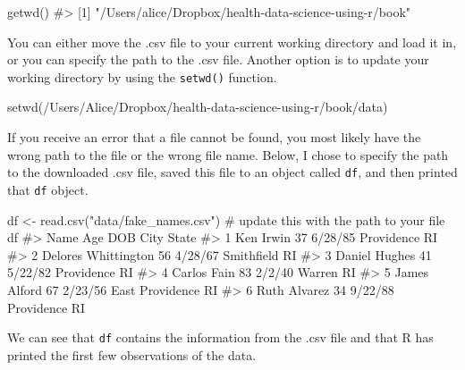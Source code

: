 \documentclass[
  letterpaper,
]{krantz}
\makeatletter
\newenvironment{Shaded}{\begin{snugshade}}{\end{snugshade}}
\newcommand{\CommentTok}[1]{\textcolor[rgb]{0.37,0.37,0.37}{#1}}
\newcommand{\FunctionTok}[1]{\textcolor[rgb]{0.28,0.35,0.67}{#1}}
\newcommand{\NormalTok}[1]{\textcolor[rgb]{0.00,0.23,0.31}{#1}}
\newcommand{\OtherTok}[1]{\textcolor[rgb]{0.00,0.23,0.31}{#1}}
\newcommand{\StringTok}[1]{\textcolor[rgb]{0.13,0.47,0.30}{#1}}
\newenvironment{kframe}{%
\medskip{}
\setlength{\fboxsep}{.8em}
 \def\at@end@of@kframe{}%
 \ifinner\ifhmode%
  \def\at@end@of@kframe{\end{minipage}}%
  \begin{minipage}{\columnwidth}%
 \fi\fi%
 \def\FrameCommand##1{\hskip\@totalleftmargin \hskip-\fboxsep
 \colorbox{shadecolor}{##1}\hskip-\fboxsep
     \hskip-\linewidth \hskip-\@totalleftmargin \hskip\columnwidth}%
 \MakeFramed {\advance\hsize-\width
   \@totalleftmargin\z@ \linewidth\hsize
   \@setminipage}}%
 {\par\unskip\endMakeFramed%
 \at@end@of@kframe}
\renewenvironment{Shaded}{\begin{kframe}}{\end{kframe}}
\makeatother
\begin{document}
\begin{Shaded}
\begin{Highlighting}[]
\FunctionTok{getwd}\NormalTok{()}
\CommentTok{\#\textgreater{} [1] "/Users/alice/Dropbox/health{-}data{-}science{-}using{-}r/book"}
\end{Highlighting}
\end{Shaded}

You can either move the .csv file to your current working directory and
load it in, or you can specify the path to the .csv file. Another option
is to update your working directory by using the \texttt{setwd()}
function.

\begin{Shaded}
\begin{Highlighting}[]
\FunctionTok{setwd}\NormalTok{(}\StringTok{\textquotesingle{}/Users/Alice/Dropbox/health{-}data{-}science{-}using{-}r/book/data\textquotesingle{}}\NormalTok{)}
\end{Highlighting}
\end{Shaded}

If you receive an error that a file cannot be found, you most likely
have the wrong path to the file or the wrong file name. Below, I chose
to specify the path to the downloaded .csv file, saved this file to an
object called \texttt{df}, and then printed that \texttt{df} object.

\begin{Shaded}
\begin{Highlighting}[]
\NormalTok{df }\OtherTok{\textless{}{-}} \FunctionTok{read.csv}\NormalTok{(}\StringTok{"data/fake\_names.csv"}\NormalTok{) }\CommentTok{\# update this with the path to your file}
\NormalTok{df}
\CommentTok{\#\textgreater{}                  Name Age     DOB            City State}
\CommentTok{\#\textgreater{} 1           Ken Irwin  37 6/28/85      Providence    RI}
\CommentTok{\#\textgreater{} 2 Delores Whittington  56 4/28/67      Smithfield    RI}
\CommentTok{\#\textgreater{} 3       Daniel Hughes  41 5/22/82      Providence    RI}
\CommentTok{\#\textgreater{} 4         Carlos Fain  83  2/2/40          Warren    RI}
\CommentTok{\#\textgreater{} 5        James Alford  67 2/23/56 East Providence    RI}
\CommentTok{\#\textgreater{} 6        Ruth Alvarez  34 9/22/88      Providence    RI}
\end{Highlighting}
\end{Shaded}

We can see that \texttt{df} contains the information from the .csv file
and that R has printed the first few observations of the data.
\end{document}
